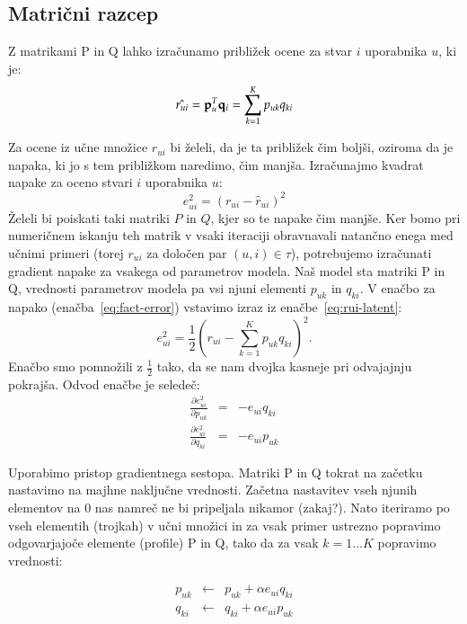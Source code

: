 \subsection{Matrični razcep}

Z matrikami P in Q lahko izračunamo približek ocene za stvar $i$ uporabnika $u$, ki je:
%
\begin{equation}\label{eq:rui-latent}
  \hat{r_{ui}}={\bf p}_u^T {\bf q}_i = \sum_{k=1}^K p_{uk} q_{ki}
\end{equation}

Za ocene iz učne množice $r_{ui}$ bi želeli, da je ta približek čim boljši, oziroma da je napaka, ki jo s tem približkom naredimo, čim manjša. Izračunajmo kvadrat napake za oceno stvari $i$ uporabnika $u$:
%
\begin{equation}\label{eq:fact-error}
  e_{ui}^2 = (r_{ui}-\hat{r}_{ui})^2
\end{equation}
%
Želeli bi poiskati taki matriki $P$ in $Q$, kjer so te napake čim manjše. Ker bomo pri numeričnem iskanju teh matrik v vsaki iteraciji obravnavali natančno enega med učnimi primeri (torej $r_{ui}$ za določen par $(u,i)\in\tau$), potrebujemo izračunati gradient napake za vsakega od parametrov modela. Naš model sta matriki P in Q, vrednosti parametrov modela pa vsi njuni elementi $p_{uk}$ in $q_{ki}$. V enačbo za napako (enačba~\ref{eq:fact-error}) vstavimo izraz iz enačbe~\ref{eq:rui-latent}:
%
\begin{equation}
  e_{ui}^2 = \frac{1}{2}\left(r_{ui}-\sum_{k=1}^K p_{uk} q_{ki}\right)^2.
\end{equation}
%
Enačbo smo pomnožili z $\frac{1}{2}$ tako, da se nam dvojka kasneje pri odvajajnju pokrajša. Odvod enačbe je seledeč:
%
\begin{eqnarray}
  \frac{\partial e_{ui}^2}{\partial p_{uk}} & = & -e_{ui}q_{ki} \\
  \frac{\partial e_{ui}^2}{\partial q_{ki}} & = & -e_{ui}p_{uk} \nonumber
\end{eqnarray}

Uporabimo pristop gradientnega sestopa. Matriki P in Q tokrat na začetku nastavimo na majhne naključne vrednosti. Začetna nastavitev vseh njunih elementov na 0 nas namreč ne bi pripeljala nikamor (zakaj?). Nato iteriramo po vseh elementih (trojkah) v učni množici in za vsak primer ustrezno popravimo odgovarjajoče elemente (profile) P in Q, tako da za vsak $k=1\ldots K$ popravimo vrednosti:

\begin{eqnarray}
  p_{uk} & \leftarrow & p_{uk} + \alpha e_{ui} q_{ki} \\
  q_{ki} & \leftarrow & q_{ki} + \alpha e_{ui} p_{uk} \nonumber
\end{eqnarray}

